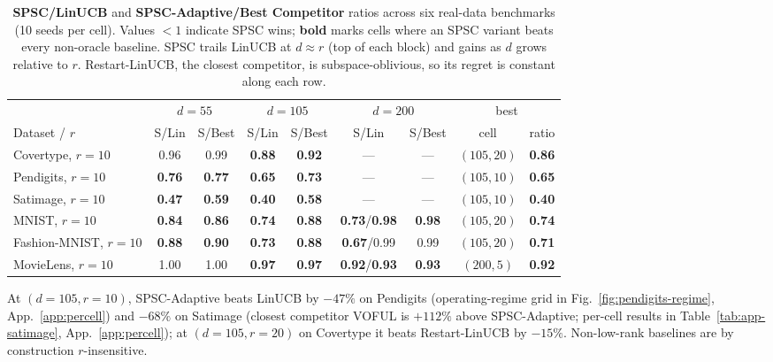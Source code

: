 \documentclass{article}
\begin{document}
\begin{table}[!htbp]
\centering
\caption{\textbf{SPSC/LinUCB} and \textbf{SPSC-Adaptive/Best
  Competitor} ratios across six real-data benchmarks (10 seeds per
  cell). Values ${<}1$ indicate SPSC wins; \textbf{bold} marks cells
  where an SPSC variant beats every non-oracle baseline. SPSC trails
  LinUCB at $d\approx r$ (top of each block) and gains as $d$ grows
  relative to $r$. Restart-LinUCB, the closest competitor, is
  subspace-oblivious, so its regret is constant along each row.}
\label{tab:realdata}
\scriptsize
\setlength{\tabcolsep}{4pt}
\begin{tabular}{lcc@{\hspace{8pt}}cc@{\hspace{8pt}}cc@{\hspace{8pt}}cc}
\toprule
 & \multicolumn{2}{c}{$d{=}55$} & \multicolumn{2}{c}{$d{=}105$} & \multicolumn{2}{c}{$d{=}200$} & \multicolumn{2}{c}{best}\\
\cmidrule(lr){2-3}\cmidrule(lr){4-5}\cmidrule(lr){6-7}\cmidrule(lr){8-9}
Dataset / $r$ & S/Lin & S/Best & S/Lin & S/Best & S/Lin & S/Best & cell & ratio\\
\midrule
Covertype,      $r{=}10$ & 0.96           & 0.99           & \textbf{0.88} & \textbf{0.92} &  --- & ---  & $(105,20)$ & \textbf{0.86}\\
Pendigits,      $r{=}10$ & \textbf{0.76}  & \textbf{0.77}  & \textbf{0.65} & \textbf{0.73} &  --- & ---  & $(105,10)$ & \textbf{0.65}\\
Satimage,       $r{=}10$ & \textbf{0.47}  & \textbf{0.59}  & \textbf{0.40} & \textbf{0.58} &  --- & ---  & $(105,10)$ & \textbf{0.40}\\
MNIST,          $r{=}10$ & \textbf{0.84}  & \textbf{0.86}  & \textbf{0.74} & \textbf{0.88} & \textbf{0.73}/\textbf{0.98} & \textbf{0.98} & $(105,20)$ & \textbf{0.74}\\
Fashion-MNIST,  $r{=}10$ & \textbf{0.88}  & \textbf{0.90}  & \textbf{0.73} & \textbf{0.88} & \textbf{0.67}/0.99         & 0.99          & $(105,20)$ & \textbf{0.71}\\
MovieLens,      $r{=}10$ & 1.00           & 1.00           & \textbf{0.97} & \textbf{0.97} & \textbf{0.92}/\textbf{0.93} & \textbf{0.93} & $(200,5)$  & \textbf{0.92}\\
\bottomrule
\end{tabular}
\end{table}

At $(d{=}105, r{=}10)$, SPSC-Adaptive beats LinUCB by $-47\%$ on
Pendigits (operating-regime grid in Fig.~\ref{fig:pendigits-regime},
App.~\ref{app:percell}) and $-68\%$ on Satimage (closest competitor
VOFUL is $+112\%$ above SPSC-Adaptive; per-cell results in
Table~\ref{tab:app-satimage}, App.~\ref{app:percell}); at
$(d{=}105, r{=}20)$ on Covertype it beats Restart-LinUCB by $-15\%$.
Non-low-rank baselines are by construction $r$-insensitive.
\end{document}
